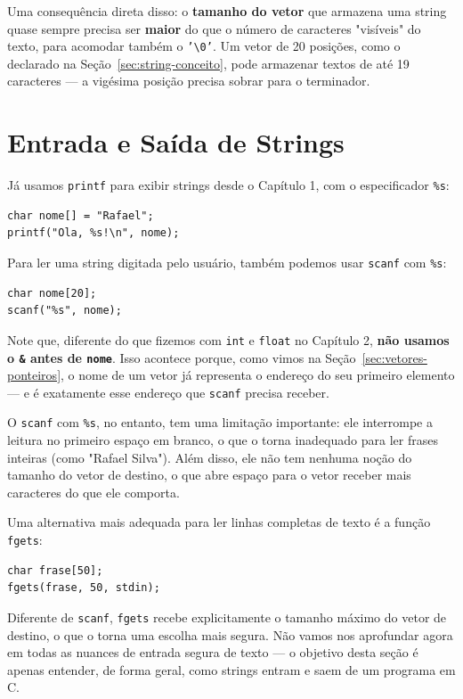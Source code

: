 \documentclass[12pt,a4paper,oneside]{extreport}
\begin{document}
Uma consequência direta disso: o \textbf{tamanho do vetor} que armazena uma string quase sempre precisa ser \textbf{maior} do que o número de caracteres "visíveis" do texto, para acomodar também o \texttt{'\textbackslash 0'}. Um vetor de 20 posições, como o declarado na Seção~\ref{sec:string-conceito}, pode armazenar textos de até 19 caracteres — a vigésima posição precisa sobrar para o terminador.

\section{Entrada e Saída de Strings}

Já usamos \texttt{printf} para exibir strings desde o Capítulo 1, com o especificador \texttt{\%s}:

\begin{lstlisting}
char nome[] = "Rafael";
printf("Ola, %s!\n", nome);
\end{lstlisting}

Para ler uma string digitada pelo usuário, também podemos usar \texttt{scanf} com \texttt{\%s}:

\begin{lstlisting}
char nome[20];
scanf("%s", nome);
\end{lstlisting}

Note que, diferente do que fizemos com \texttt{int} e \texttt{float} no Capítulo 2, \textbf{não usamos o \texttt{\&} antes de \texttt{nome}}. Isso acontece porque, como vimos na Seção~\ref{sec:vetores-ponteiros}, o nome de um vetor já representa o endereço do seu primeiro elemento — e é exatamente esse endereço que \texttt{scanf} precisa receber.

O \texttt{scanf} com \texttt{\%s}, no entanto, tem uma limitação importante: ele interrompe a leitura no primeiro espaço em branco, o que o torna inadequado para ler frases inteiras (como "Rafael Silva"). Além disso, ele não tem nenhuma noção do tamanho do vetor de destino, o que abre espaço para o vetor receber mais caracteres do que ele comporta.

Uma alternativa mais adequada para ler linhas completas de texto é a função \texttt{fgets}:

\begin{lstlisting}
char frase[50];
fgets(frase, 50, stdin);
\end{lstlisting}

Diferente de \texttt{scanf}, \texttt{fgets} recebe explicitamente o tamanho máximo do vetor de destino, o que o torna uma escolha mais segura. Não vamos nos aprofundar agora em todas as nuances de entrada segura de texto — o objetivo desta seção é apenas entender, de forma geral, como strings entram e saem de um programa em C.
\end{document}
